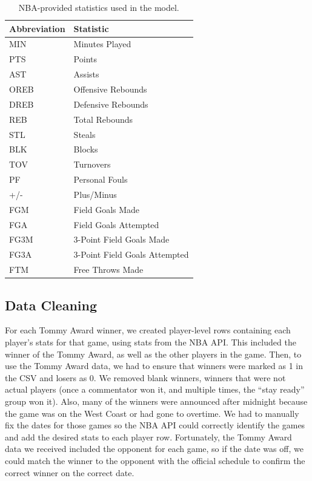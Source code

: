 \documentclass[11pt]{article}
\begin{document}
\begin{table}[htbp]
  \centering
  \caption{NBA-provided statistics used in the model.}
  \label{tab:nba-box}
  \begin{tabular}{@{}ll@{}}
    \toprule
    \textbf{Abbreviation} & \textbf{Statistic} \\
    \midrule
    MIN & Minutes Played \\
    PTS & Points \\
    AST & Assists \\
    OREB & Offensive Rebounds \\
    DREB & Defensive Rebounds \\
    REB & Total Rebounds \\
    STL & Steals \\
    BLK & Blocks \\
    TOV & Turnovers \\
    PF & Personal Fouls \\
    +/- & Plus/Minus \\
    FGM & Field Goals Made \\
    FGA & Field Goals Attempted \\
    FG3M & 3-Point Field Goals Made \\
    FG3A & 3-Point Field Goals Attempted \\
    FTM & Free Throws Made \\
    \bottomrule
  \end{tabular}
\end{table}

\subsection{Data Cleaning}
For each Tommy Award winner, we created player-level rows containing each player's stats for that game, using stats from the NBA API. This included the winner of the Tommy Award, as well as the other players in the game. Then, to use the Tommy Award data, we had to ensure that winners were marked as 1 in the CSV and losers as 0. We removed blank winners, winners that were not actual players (once a commentator won it, and multiple times, the ``stay ready'' group won it). Also, many of the winners were announced after midnight because the game was on the West Coast or had gone to overtime. We had to manually fix the dates for those games so the NBA API could correctly identify the games and add the desired stats to each player row. Fortunately, the Tommy Award data we received included the opponent for each game, so if the date was off, we could match the winner to the opponent with the official schedule to confirm the correct winner on the correct date.
\end{document}

